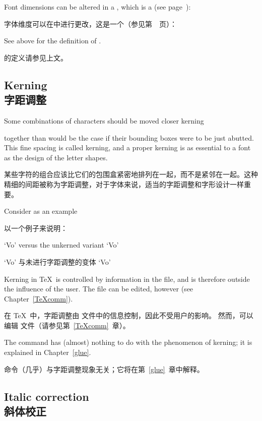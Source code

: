 Font dimensions can be altered in a ,
which is a  (see page~\pageref{global:assign}):

字体维度可以在中进行更改，这是一个（参见第~\pageref{global:assign}~页）：
\begin{Disp}
\end{Disp} See above for the definition of .

的定义请参见上文。


\subsection{Kerning\\字距调整}

Some combinations of characters should be moved closer
\term kerning\par
together than would be the case if their bounding boxes
were to be just abutted. This fine spacing is called kerning,
and a proper kerning is as essential to a font as the
design of the letter shapes.

某些字符的组合应该比它们的包围盒紧密地排列在一起，而不是紧邻在一起。这种精细的间距被称为字距调整，对于字体来说，适当的字距调整和字形设计一样重要。

Consider as an example

以一个例子来说明：
\begin{Disp} `Vo' versus the unkerned variant `V\hbox{}o'\end{Disp}
\begin{Disp} `Vo' 与未进行字距调整的变体 `V\hbox{}o'\end{Disp}


Kerning in \TeX\ is controlled by information in the
 file, and is therefore outside the influence of the
user. The  file can be edited, however (see Chapter~\ref{TeXcomm}).

在 \TeX\ 中，字距调整由  文件中的信息控制，因此不受用户的影响。
然而，可以编辑  文件（请参见第~\ref{TeXcomm}~章）。

The  command has (almost) nothing to do with the
phenomenon of kerning; it is explained in Chapter~\ref{glue}.

 命令（几乎）与字距调整现象无关；它将在第~\ref{glue}~章中解释。


\subsection{Italic correction\\斜体校正}

